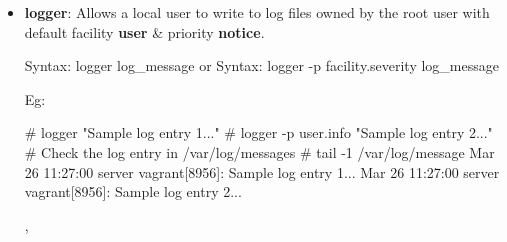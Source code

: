 \setlength{\columnsep}{3pt}
\begin{flushleft}
\bigskip


\begin{itemize}
\item \textbf{logger}: Allows a local user to write to log files owned by the root user with default facility \textbf{user} \& priority \textbf{notice}.
\begin{tcolorbox}[breakable,notitle,boxrule=-0pt,colback=pink,colframe=pink]
	\color{black}
	\font=9pt
	Syntax: logger log\_message
	\newline
	or
	\newline
	Syntax: logger -p facility.severity	 log\_message
	\font=4pt
\end{tcolorbox}
Eg:	
\begin{tcolorbox}[breakable,notitle,boxrule=-0pt,colback=black,colframe=black]
	\color{green}
	\font=9pt
	\# logger "Sample log entry 1..."
	\newline
	\# logger -p user.info "Sample log entry 2..."
	\newline
	\newline
	\color{yellow}
	\# Check the log entry in /var/log/messages
	\newline
	\color{green}
	\# tail -1 /var/log/message
	\newline
	\color{white}
	Mar 26 11:27:00 server vagrant[8956]: Sample log entry 1...
	\newline
	Mar 26 11:27:00 server vagrant[8956]: Sample log entry 2...
	\font=4pt
\end{tcolorbox}
	, 
	
\end{itemize}



\end{flushleft}
\newpage


